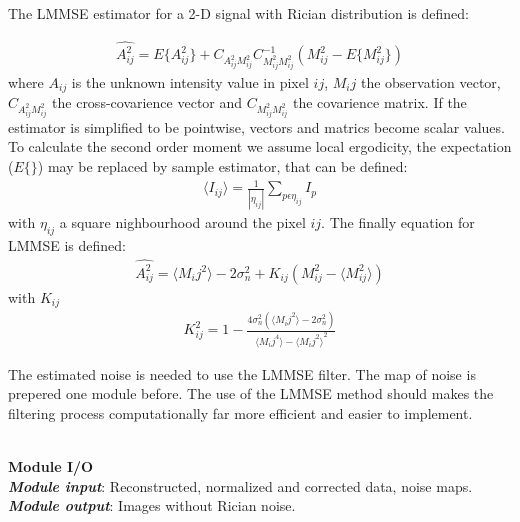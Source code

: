 The LMMSE estimator for a 2-D signal with Rician distribution is defined:

\begin{equation}
\begin{aligned}\widehat{A_{ij}^{2}}=E\{A_{ij}^{2}\}+C_{A_{ij}^{2}M_{ij}^{2}}C_{M_{ij}^{2}M_{ij}^{2}}^{-1}(M_{ij}^{2}-E\{M_{ij}^{2}\})\end{aligned}
\label{m4eq1}
\end{equation}
where $A_{ij}$ is the unknown intensity value in pixel $ij$, $M_{i}j$
the observation vector, $C_{A_{ij}^{2}M_{ij}^{2}}$ the cross-covarience
vector and $C_{M_{ij}^{2}M_{ij}^{2}}$ the covarience matrix. If the
estimator is simplified to be pointwise, vectors and matrics become
scalar values. 
To calculate the second order moment we assume local ergodicity, the expectation ($E\{\}$) may be replaced by sample estimator, that can be defined: 
\begin{equation}
\begin{aligned}\langle I_{ij}\rangle=\frac{1}{|\eta_{ij}|}\sum\limits_{p\epsilon\eta_{ij}} I_p \end{aligned}
\label{m4eq2}
\end{equation}
with $\eta_{ij}$ a square nighbourhood around the pixel $ij$. The finally equation for LMMSE is defined:
\begin{equation}
\begin{aligned}\widehat{A_{ij}^{2}}=\langle M_{i}j^{2}\rangle-2\sigma_{n}^{2}+K_{ij}(M_{ij}^{2}-\langle M_{ij}^{2}\rangle)\end{aligned}
\label{m4eq3}
\end{equation}
with $K_{ij}$ 
\begin{equation}
\begin{aligned}K_{ij}^{2}=1-\frac{4\sigma_{n}^{2}(\langle M_{i}j^{2}\rangle-2\sigma_{n}^{2})}{\langle M_{i}j^{4}\rangle-{\langle M_{i}j^{2}\rangle}^{2}}\end{aligned}
\label{m4eq4}
\end{equation}

The estimated noise is needed to use the LMMSE filter. The map of noise is prepered one module before. The use of the LMMSE method should makes the filtering process computationally far more efficient and easier to implement. 

\hfill{}\\
\textbf{Module I/O}\\
\textbf{\emph{Module input}}: Reconstructed, normalized and corrected data, noise maps.
\textbf{\emph{Module output}}: Images without Rician noise.
